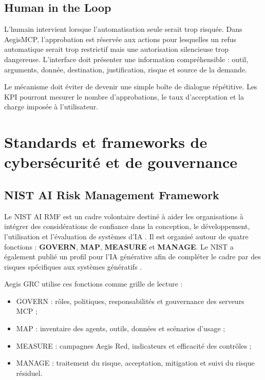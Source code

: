 \subsection{Human in the Loop}

L'humain intervient lorsque l'automatisation seule serait trop risquée. Dans AegisMCP, l'approbation est réservée aux actions pour lesquelles un refus automatique serait trop restrictif mais une autorisation silencieuse trop dangereuse. L'interface doit présenter une information compréhensible : outil, arguments, donnée, destination, justification, risque et source de la demande.

Le mécanisme doit éviter de devenir une simple boîte de dialogue répétitive. Les KPI pourront mesurer le nombre d'approbations, le taux d'acceptation et la charge imposée à l'utilisateur.

\section{Standards et frameworks de cybersécurité et de gouvernance}

\subsection{NIST AI Risk Management Framework}

Le NIST AI RMF est un cadre volontaire destiné à aider les organisations à intégrer des considérations de confiance dans la conception, le développement, l'utilisation et l'évaluation de systèmes d'IA \cite{nistairmf}. Il est organisé autour de quatre fonctions : \textbf{GOVERN}, \textbf{MAP}, \textbf{MEASURE} et \textbf{MANAGE}. Le NIST a également publié un profil pour l'IA générative afin de compléter le cadre par des risques spécifiques aux systèmes génératifs \cite{nistgenai}.

Aegis GRC utilise ces fonctions comme grille de lecture :

\begin{itemize}
    \item GOVERN : rôles, politiques, responsabilités et gouvernance des serveurs MCP ;
    \item MAP : inventaire des agents, outils, données et scénarios d'usage ;
    \item MEASURE : campagnes Aegis Red, indicateurs et efficacité des contrôles ;
    \item MANAGE : traitement du risque, acceptation, mitigation et suivi du risque résiduel.
\end{itemize}

